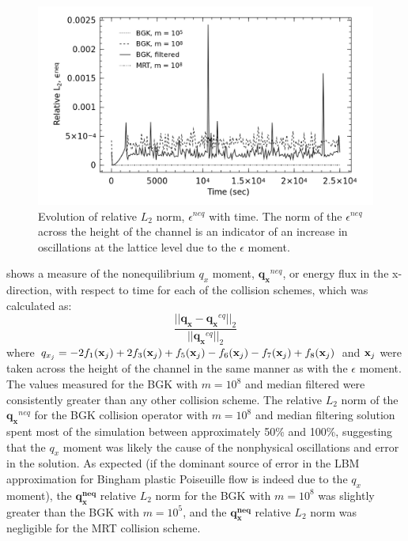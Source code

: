 \begin{figure}
	\centering
    \includegraphics[width=\linewidth]{figs/poise-bingham/epsilon}
    \caption{Evolution of relative $L_2$ norm, $\epsilon^{neq}$ with time. The norm of the $\epsilon^{neq}$ across the height of the channel is an indicator of an increase in oscillations at the lattice level due to the $\epsilon$ moment.}
    \label{fig:epsilon}
\end{figure}

 shows a measure of the nonequilibrium $q_x$ moment, $\mathbf{q_x}^{neq}$, or energy flux in the x-direction, with respect to time for each of the collision schemes, which was calculated as:
\begin{equation}
    \frac{||\mathbf{q_x} - \mathbf{q_x}^{eq}||_2}{||\mathbf{q_x}^{eq}||_2}
\end{equation}
\noindent where $q_{x_j} = - 2f_1(\mathbf{x}_j) + 2f_3(\mathbf{x}_j) + f_5(\mathbf{x}_j) - f_6(\mathbf{x}_j) - f_7(\mathbf{x}_j) + f_8(\mathbf{x}_j)$ and $\mathbf{x}_j$ were taken across the height of the channel in the same manner as with the $\epsilon$ moment.
The values measured for the BGK with $m = 10^8$ and median filtered were consistently greater than any other collision scheme.
The relative $L_2$ norm of the $\mathbf{q_x}^{neq}$ for the BGK collision operator with $m = 10^8$ and median filtering solution spent most of the simulation between approximately 50\% and 100\%, suggesting that the $q_x$ moment was likely the cause of the nonphysical oscillations and error in the solution.
As expected (if the dominant source of error in the LBM approximation for Bingham plastic Poiseuille flow is indeed due to the $q_x$ moment), the $\mathbf{q_x^{neq}}$ relative $L_2$ norm for the BGK with $m = 10^8$ was slightly greater than the BGK with $m = 10^5$, and the $\mathbf{q_x^{neq}}$ relative $L_2$ norm was negligible for the MRT collision scheme.

